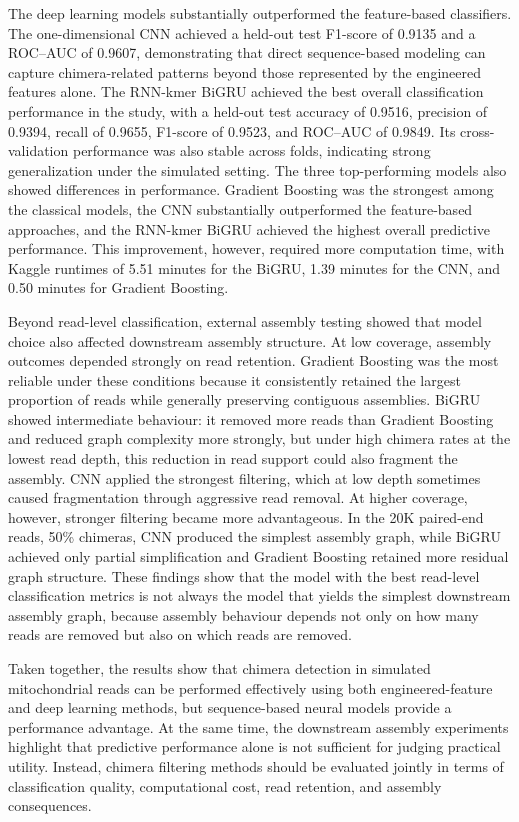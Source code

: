 The deep learning models substantially outperformed the feature-based classifiers. The one-dimensional CNN achieved a held-out test F1-score of 0.9135 and a ROC--AUC of 0.9607, demonstrating that direct sequence-based modeling can capture chimera-related patterns beyond those represented by the engineered features alone. The RNN-kmer BiGRU achieved the best overall classification performance in the study, with a held-out test accuracy of 0.9516, precision of 0.9394, recall of 0.9655, F1-score of 0.9523, and ROC--AUC of 0.9849. Its cross-validation performance was also stable across folds, indicating strong generalization under the simulated setting. The three top-performing models also showed differences in performance. Gradient Boosting was the strongest among the classical models, the CNN substantially outperformed the feature-based approaches, and the RNN-kmer BiGRU achieved the highest overall predictive performance. This improvement, however, required more computation time, with Kaggle runtimes of 5.51 minutes for the BiGRU, 1.39 minutes for the CNN, and 0.50 minutes for Gradient Boosting.

Beyond read-level classification, external assembly testing showed that model choice also affected downstream assembly structure. At low coverage, assembly outcomes depended strongly on read retention. Gradient Boosting was the most reliable under these conditions because it consistently retained the largest proportion of reads while generally preserving contiguous assemblies. BiGRU showed intermediate behaviour: it removed more reads than Gradient Boosting and reduced graph complexity more strongly, but under high chimera rates at the lowest read depth, this reduction in read support could also fragment the assembly. CNN applied the strongest filtering, which at low depth sometimes caused fragmentation through aggressive read removal. At higher coverage, however, stronger filtering became more advantageous. In the 20K paired-end reads, 50\% chimeras, CNN produced the simplest assembly graph, while BiGRU achieved only partial simplification and Gradient Boosting retained more residual graph structure. These findings show that the model with the best read-level classification metrics is not always the model that yields the simplest downstream assembly graph, because assembly behaviour depends not only on how many reads are removed but also on which reads are removed.

Taken together, the results show that chimera detection in simulated mitochondrial reads can be performed effectively using both engineered-feature and deep learning methods, but sequence-based neural models provide a performance advantage. At the same time, the downstream assembly experiments highlight that predictive performance alone is not sufficient for judging practical utility. Instead, chimera filtering methods should be evaluated jointly in terms of classification quality, computational cost, read retention, and assembly consequences.

